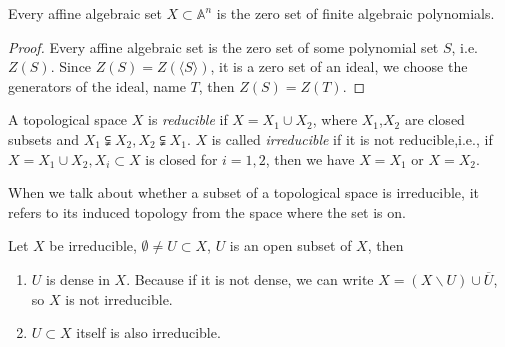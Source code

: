 \begin{corollary}
	Every affine algebraic set $ X\subset \mathbb{A}^n $ is the zero set of finite algebraic polynomials.
\end{corollary}
\begin{proof}
	Every affine algebraic set is the zero set of some polynomial set $ S $, i.e. $ Z(S) $. Since $ Z(S)=Z(\langle S \rangle) $, it is a zero set of an ideal, we choose the generators of the ideal, name $ T $, then $ Z(S)=Z(T) $.
\end{proof}
\begin{definition}
	A topological space $ X $ is \textit{reducible} if $ X=X_1\cup X_2 $, where $ X_1 $,$ X_2 $ are closed  subsets and $ X_1\subsetneqq X_2,X_2\subsetneqq X_1 $. $X$ is called \textit{irreducible} if it is not reducible,i.e., if $ X=X_1\cup X_2, X_i\subset  X $ is closed for $ i=1,2 $, then we have $ X=X_1 $ or $ X=X_2 $.
\end{definition}
\begin{remark}
	When we talk about whether a subset of a topological space is irreducible, it refers to its induced topology from the space where the set is on.
\end{remark}
\begin{proposition}
	Let $ X $ be irreducible, $ \emptyset\neq U\subset X $, $ U $ is an open subset of $ X $, then
	\begin{enumerate}
		\item   $ U $ is dense in $ X $. Because if it is not dense, we can write $ X=(X\backslash U )\cup \overline{U} $, so $ X $ is not irreducible.
		\item $ U \subset X$ itself is also irreducible.
	\end{enumerate}
\end{proposition}

